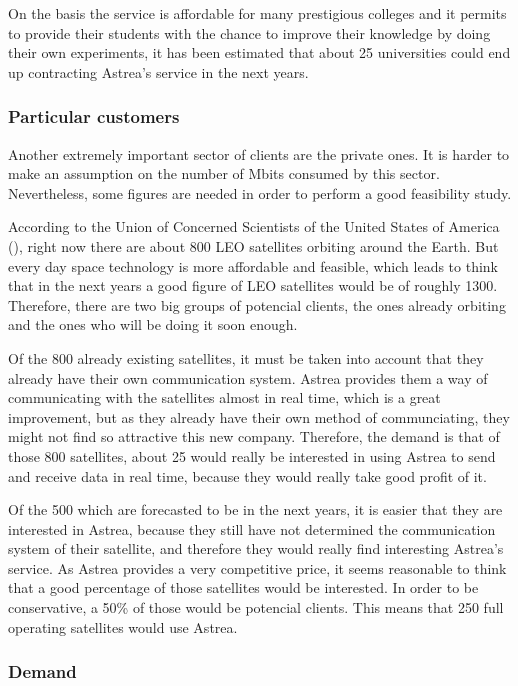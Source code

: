 On the basis the service is affordable for many prestigious colleges and it permits to provide their students with the chance to improve their knowledge by doing their own experiments, it has been estimated that about 25 universities could end up contracting Astrea's service in the next years.

\subsubsection{Particular customers}
Another extremely important sector of clients are the private ones. It is harder to make an assumption on the number of Mbits consumed by this sector. Nevertheless, some figures are needed in order to perform a good feasibility study. 

According to the Union of Concerned Scientists of the United States of America (\cite{UCSUSA}), right now there are about 800 LEO satellites orbiting around the Earth. But every day space technology is more affordable and feasible, which leads to think that in the next years a good figure of LEO satellites would be of roughly 1300. Therefore, there are two big groups of potencial clients, the ones already orbiting and the ones who will be doing it soon enough.

Of the 800 already existing satellites, it must be taken into account that they already have their own communication system. Astrea provides them a way of communicating with the satellites almost in real time, which is a great improvement, but as they already have their own method of communciating, they might not find so attractive this new company. Therefore, the demand is that of those 800 satellites, about 25 would really be interested in using Astrea to send and receive data in real time, because they would really take good profit of it.

Of the 500 which are forecasted to be in the next years, it is easier that they are interested in Astrea, because they still have not determined the communication system of their satellite, and therefore they would really find interesting Astrea's service. As Astrea provides a very competitive price, it seems reasonable to think that a good percentage of those satellites would be interested. In order to be conservative, a 50\% of those would be potencial clients. This means that 250 full operating satellites would use Astrea.

\subsubsection{Demand}


